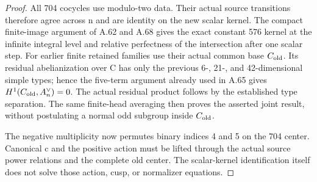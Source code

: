 \begin{proof}
All 704 cocycles use modulo-two data. Their actual source transitions
therefore agree across n and are identity on the new scalar kernel.
The compact finite-image argument of A.62 and A.68 gives the exact
constant 576 kernel at the infinite integral level and relative
perfectness of the intersection after one scalar step.
For earlier finite retained families use their actual common base
\(C_{\rm old}\). Its residual abelianization over C has only the
previous 6-, 21-, and 42-dimensional simple types; hence the five-term
argument already used in A.65 gives
\(H^1(C_{\rm old},A_n^\vee)=0\). The actual residual product follows
by the established type separation. The same finite-head averaging
then proves the asserted joint result, without postulating a normal
odd subgroup inside \(C_{\rm old}\).

The negative multiplicity now permutes binary indices 4 and 5 on the
704 center. Canonical c and the positive action must be lifted through
the actual source power relations and the complete old center.
The scalar-kernel identification itself does not solve those action,
cusp, or normalizer equations.
\end{proof}
